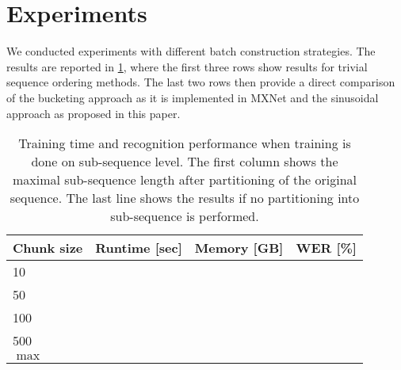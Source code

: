 \documentclass{article}
\begin{document}
  \section{Experiments} \label{sec:experiments}
   We conducted experiments with different batch construction strategies. The results are reported in \ref{tab:chime:batch}, where the first three rows show results for trivial sequence ordering 
   methods. The last two rows then provide a direct comparison of the bucketing approach as 
   it is implemented in MXNet and the sinusoidal approach as proposed in this paper.

	\begin{table}[tbp]
		\centering
		\caption{Training time and recognition performance when training is done 
		on sub-sequence level. The first column shows the maximal sub-sequence length 
		after partitioning of the original sequence. The last line shows the results 
		if no partitioning into sub-sequence is performed. }
		\label{tab:chime:batch}
		\begin{tabular}{lrrr}
			\hline
			Chunk size              & Runtime [sec] & Memory [GB] & WER [\%] \\
			\hline
			10     					&				&			  &			 \\
			50  					&				&			  & 		 \\
			100 					& 				&			  &			 \\
			500						& 				&			  &			 \\
			$\max$					&				&			  &			 \\
			\hline
		\end{tabular}
	\end{table}
\end{document}
